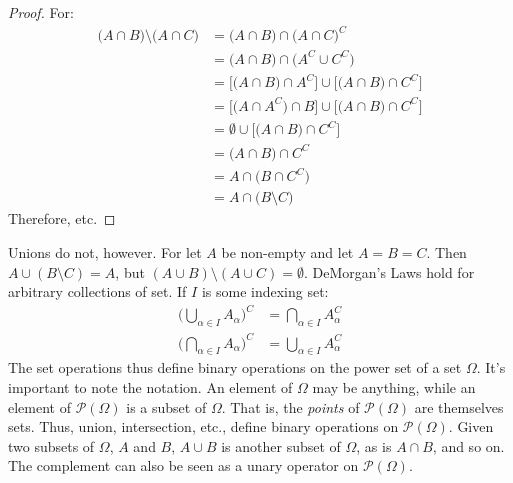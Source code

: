 \documentclass[crop=false,class=book,oneside]{standalone}
\begin{document}
            \begin{proof}
                For:
                \begin{subequations}
                    \begin{align}
                        \big(A\cap{B}\big)\setminus
                            \big(A\cap{C}\big)
                        &=\big(A\cap{B}\big)
                            \cap\big(A\cap{C}\big)^{C}\\
                        &=\big(A\cap{B}\big)
                            \cap\big(A^{C}\cup{C}^{C}\big)\\
                        &=\big[\big(A\cap{B}\big)\cap{A}^{C}\big]
                            \cup\big[\big({A}\cap{B}\big)
                            \cap{C}^{C}\big]\\
                        &=\big[\big(A\cap{A}^{C}\big)\cap{B}\big]
                            \cup\big[\big(A\cap{B}\big)
                            \cap{C}^{C}\big]\\
                        &=\emptyset\cup\big[\big(A\cap{B}\big)
                            \cap{C}^{C}\big]\\
                        &=\big(A\cap{B}\big)\cap{C}^{C}\\
                        &=A\cap\big(B\cap{C}^{C}\big)\\
                        &=A\cap\big(B\setminus{C}\big)
                    \end{align}
                \end{subequations}
                Therefore, etc.
            \end{proof}
            Unions do not, however. For let $A$ be non-empty
            and let $A=B=C$. Then $A\cup(B\setminus{C})=A$, but
            $(A\cup{B})\setminus(A\cup{C})=\emptyset$.
            DeMorgan's Laws hold for arbitrary collections
            of set. If $I$ is some indexing set:
            \begin{align}
                \Big(\bigcup_{\alpha\in{I}}A_{\alpha}\Big)^{C}
                &=\bigcap_{\alpha\in{I}}A_{\alpha}^{C}\\
                \Big(\bigcap_{\alpha\in{I}}A_{\alpha}\Big)^{C}
                &=\bigcup_{\alpha\in{I}}A_{\alpha}^{C}
            \end{align}
            The set operations thus define binary operations
            on the power set of a set $\Omega$. It's important
            to note the notation. An element of $\Omega$ may
            be anything, while an element of
            $\mathcal{P}(\Omega)$ is a subset of $\Omega$.
            That is, the \textit{points} of $\mathcal{P}(\Omega)$
            are themselves sets. Thus, union, intersection,
            etc., define binary operations on
            $\mathcal{P}(\Omega)$. Given two subsets of
            $\Omega$, $A$ and $B$, $A\cup{B}$ is another
            subset of $\Omega$, as is $A\cap{B}$, and so on.
            The complement can also be seen as a unary operator
            on $\mathcal{P}(\Omega)$.
\end{document}
